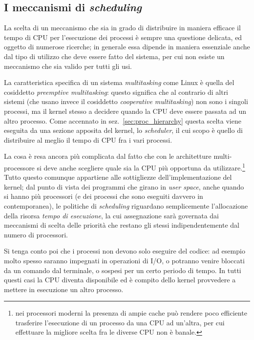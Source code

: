 \subsection{I meccanismi di \textit{scheduling}}
\label{sec:proc_sched}


La scelta di un meccanismo che sia in grado di distribuire in maniera efficace
il tempo di CPU per l'esecuzione dei processi è sempre una questione delicata,
ed oggetto di numerose ricerche; in generale essa dipende in maniera
essenziale anche dal tipo di utilizzo che deve essere fatto del sistema, per
cui non esiste un meccanismo che sia valido per tutti gli usi.

La caratteristica specifica di un sistema \textit{multitasking} come Linux è
quella del cosiddetto  \textit{preemptive
  multitasking}: questo significa che al contrario di altri sistemi (che usano
invece il cosiddetto  \textit{cooperative
  multitasking}) non sono i singoli processi, ma il kernel stesso a decidere
quando la CPU deve essere passata ad un altro processo. Come accennato in
sez.~\ref{sec:proc_hierarchy} questa scelta viene eseguita da una sezione
apposita del kernel, lo \textit{scheduler}, il cui scopo è quello di
distribuire al meglio il tempo di CPU fra i vari processi.

La cosa è resa ancora più complicata dal fatto che con le architetture
multi-processore si deve anche scegliere quale sia la CPU più opportuna da
utilizzare.\footnote{nei processori moderni la presenza di ampie cache può
  rendere poco efficiente trasferire l'esecuzione di un processo da una CPU ad
  un'altra, per cui effettuare la migliore scelta fra le diverse CPU non è
  banale.}  Tutto questo comunque appartiene alle sottigliezze
dell'implementazione del kernel; dal punto di vista dei programmi che girano
in \textit{user space}, anche quando si hanno più processori (e dei processi
che sono eseguiti davvero in contemporanea), le politiche di
\textit{scheduling} riguardano semplicemente l'allocazione della risorsa
\textsl{tempo di esecuzione}, la cui assegnazione sarà governata dai
meccanismi di scelta delle priorità che restano gli stessi indipendentemente
dal numero di processori.

Si tenga conto poi che i processi non devono solo eseguire del codice: ad
esempio molto spesso saranno impegnati in operazioni di I/O, o potranno
venire bloccati da un comando dal terminale, o sospesi per un certo periodo di
tempo.  In tutti questi casi la CPU diventa disponibile ed è compito dello
kernel provvedere a mettere in esecuzione un altro processo.

